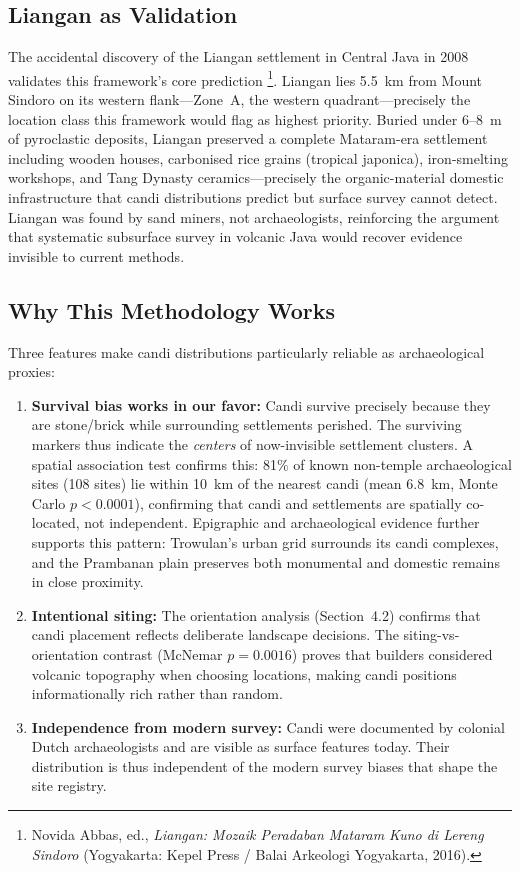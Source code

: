 \documentclass[12pt,a4paper]{article}
\begin{document}
\subsection{Liangan as Validation}

The accidental discovery of the Liangan settlement in Central Java in 2008 validates this framework's core prediction \footnote{Novida Abbas, ed., \emph{Liangan: Mozaik Peradaban Mataram Kuno di Lereng Sindoro} (Yogyakarta: Kepel Press / Balai Arkeologi Yogyakarta, 2016).}. Liangan lies 5.5~km from Mount Sindoro on its western flank---Zone~A, the western quadrant---precisely the location class this framework would flag as highest priority. Buried under 6--8~m of pyroclastic deposits, Liangan preserved a complete Mataram-era settlement including wooden houses, carbonised rice grains (tropical japonica), iron-smelting workshops, and Tang Dynasty ceramics---precisely the organic-material domestic infrastructure that candi distributions predict but surface survey cannot detect. Liangan was found by sand miners, not archaeologists, reinforcing the argument that systematic subsurface survey in volcanic Java would recover evidence invisible to current methods.

\subsection{Why This Methodology Works}

Three features make candi distributions particularly reliable as archaeological proxies:

\begin{enumerate}
    \item \textbf{Survival bias works in our favor:} Candi survive precisely because they are stone/brick while surrounding settlements perished. The surviving markers thus indicate the \emph{centers} of now-invisible settlement clusters. A spatial association test confirms this: 81\% of known non-temple archaeological sites (108 sites) lie within 10~km of the nearest candi (mean 6.8~km, Monte Carlo $p<0.0001$), confirming that candi and settlements are spatially co-located, not independent. Epigraphic and archaeological evidence further supports this pattern: Trowulan's urban grid surrounds its candi complexes, and the Prambanan plain preserves both monumental and domestic remains in close proximity.
    \item \textbf{Intentional siting:} The orientation analysis (Section~4.2) confirms that candi placement reflects deliberate landscape decisions. The siting-vs-orientation contrast (McNemar $p=0.0016$) proves that builders considered volcanic topography when choosing locations, making candi positions informationally rich rather than random.
    \item \textbf{Independence from modern survey:} Candi were documented by colonial Dutch archaeologists and are visible as surface features today. Their distribution is thus independent of the modern survey biases that shape the site registry.
\end{enumerate}
\end{document}
